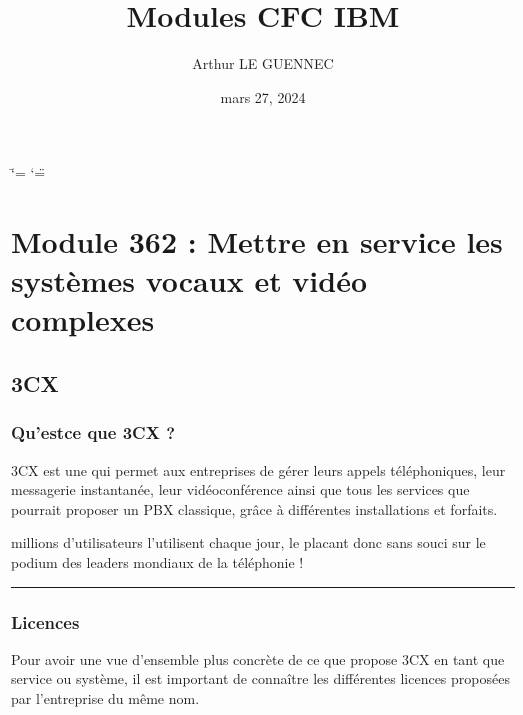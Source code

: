 \documentclass[letterpaper,10pt,french]{sphinxmanual}
\title{Modules CFC IBM}
\date{mars 27, 2024}
\author{Arthur LE GUENNEC}
\let\sphinxpxdimen\pdfpxdimen\else\newdimen\sphinxpxdimen
\begin{document}
\ifdefined\shorthandoff
  \ifnum\catcode`\=\string=\active\shorthandoff{=}\fi
  \ifnum\catcode`\"=\active{}\fi
\fi

\pagestyle{empty}
\sphinxmaketitle
\pagestyle{plain}
\sphinxtableofcontents
\pagestyle{normal}
\label{\detokenize{index::doc}}


\sphinxstepscope


\chapter{Module 362 : Mettre en service les systèmes vocaux et vidéo complexes}
\label{\detokenize{Documentation-M362:module-362-mettre-en-service-les-systemes-vocaux-et-video-complexes}}\label{\detokenize{Documentation-M362::doc}}
\noindent{\hspace*{\fill}\sphinxincludegraphics[height=32\sphinxpxdimen]{{3CX_Logo_-_Wiki}.png}}


\section{3CX}
\label{\detokenize{Documentation-M362:cx}}

\subsection{Qu’est\sphinxhyphen{}ce que 3CX ?}
\label{\detokenize{Documentation-M362:qu-est-ce-que-3cx}}
\sphinxAtStartPar
3CX est une  qui permet aux entreprises de gérer leurs appels téléphoniques, leur messagerie instantanée, leur vidéoconférence ainsi que tous les services que pourrait proposer un PBX classique, grâce à différentes installations et forfaits.

 millions d’utilisateurs l’utilisent chaque jour, le placant donc sans souci sur le podium des leaders mondiaux de la téléphonie !



\bigskip\hrule\bigskip



\subsection{Licences}
\label{\detokenize{Documentation-M362:licences}}
\sphinxAtStartPar
Pour avoir une vue d’ensemble plus concrète de ce que propose 3CX en tant que service ou système, il est important de connaître les différentes licences proposées par l’entreprise du même nom.
\end{document}
